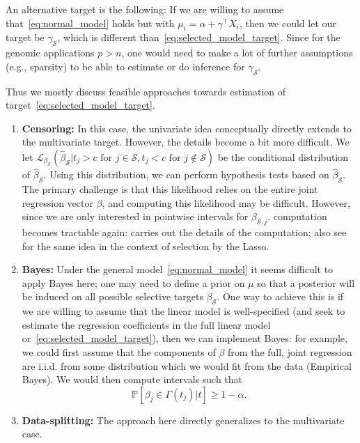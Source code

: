 	An alternative target is the following: If we are willing to assume that~\eqref{eq:normal_model} holds but with $\mu_i = \alpha + \gamma^\top X_i$, then we could let our target be $\gamma_{\mathcal{S}}$, which is different than~\eqref{eq:selected_model_target}. Since for the genomic applications $p>n$, one would need to make a lot of further assumptions (e.g., sparsity) to be able to estimate or do inference for $\gamma_{\mathcal{S}}$.

	Thus we mostly discuss feasible approaches towards estimation of target~\eqref{eq:selected_model_target}.

	\begin{enumerate}
		\item {\bf Censoring:} In this case, the univariate idea conceptually directly extends to the multivariate target. However, the details become a bit more difficult. 	We let $\mathcal L_{\beta_{\mathcal{S}}} (\hat{\beta}_{\mathcal S}| t_j > c \text{ for } j \in \mathcal{S}, t_j < c \text { for } j \notin \mathcal{S})$ be the conditional distribution of $\hat{\beta}_{\mathcal{S}}$. Using this distribution, we can perform hypothesis tests based on $\hat{\beta}_{\mathcal S}$. The primary challenge is that this likelihood relies on the entire joint regression vector $\beta$, and computing this likelihood may be difficult. However, since we are only interested in pointwise intervals for $\beta_{\mathcal{S},j}$. computation becomes tractable again: \citet{lee2014exact} carries out the details of the computation; also see~\citet{lee2016exact} for the same idea in the context of selection by the Lasso.
		\item {\bf Bayes:} Under the general model~\eqref{eq:normal_model} it seems difficult to apply Bayes here; one may need to define a prior on $\mu$ so that a posterior will be induced on all possible selective targets $\beta_{\mathcal{S}}$. One way to achieve this is if we are willing to assume that the linear model is well-specified (and seek to estimate the regression coefficients in the full linear model or~\eqref{eq:selected_model_target}), then we can implement Bayes: for example, we could first assume that the components of $\beta$ from the full, joint regression are i.i.d. from some distribution which we would fit from the data (Empirical Bayes). We would then compute intervals such that
		$$ \mathbb P [{\beta_j \in \Gamma(t_j) | t}] \geq 1 - \alpha. $$
		\item {\bf Data-splitting:}  The approach here directly generalizes to the multivariate case.
	\end{enumerate}

	




